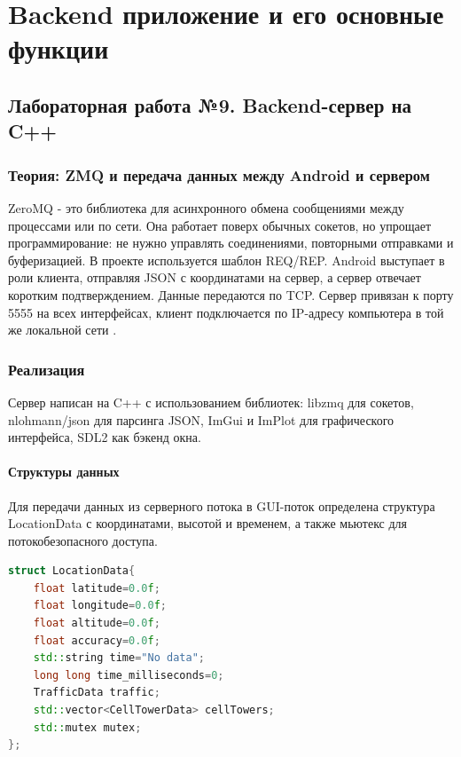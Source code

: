 \chapter{Backend приложение и его основные функции}
\label{ch:backend}
\section{Лабораторная работа №9. Backend-сервер на C++}

\subsection{Теория: ZMQ и передача данных между Android и сервером}

ZeroMQ - это библиотека для асинхронного обмена сообщениями между процессами или по сети. Она работает поверх обычных сокетов, но упрощает программирование: не нужно управлять соединениями, повторными отправками и буферизацией. В проекте используется шаблон REQ/REP. Android выступает в роли клиента, отправляя JSON с координатами на сервер, а сервер отвечает коротким подтверждением. Данные передаются по TCP. Сервер привязан к порту 5555 на всех интерфейсах, клиент подключается по IP-адресу компьютера в той же локальной сети \cite{zeromq}.

\subsection{Реализация}

Сервер написан на C++ с использованием библиотек: libzmq для сокетов, nlohmann/json для парсинга JSON, ImGui и ImPlot для графического интерфейса, SDL2 как бэкенд окна.

\subsubsection{Структуры данных}

Для передачи данных из серверного потока в GUI-поток определена структура LocationData с координатами, высотой и временем, а также мьютекс для потокобезопасного доступа.

\begin{lstlisting}[language=C++, caption=Структура LocationData, label=lst:locationdata]
struct LocationData{
    float latitude=0.0f;
    float longitude=0.0f;
    float altitude=0.0f;
    float accuracy=0.0f;
    std::string time="No data";
    long long time_milliseconds=0;
    TrafficData traffic;
    std::vector<CellTowerData> cellTowers;
    std::mutex mutex;
};
\end{lstlisting}

